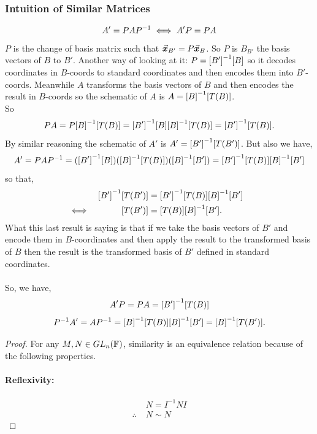 \documentclass[MathsNotesBase.tex]{subfiles}
\begin{document}
{		\medskip
		\subsubsection{Intuition of Similar Matrices}
		\[ A' = PA{P}^{-1} \iff A'P = PA \]
		$P$ is the change of basis matrix such that ${ \vec{\bm{x}}_{B'} = P\vec{\bm{x}}_B }$. So $P$ is $B_{B'}$ the basis vectors of $B$ \wrt to $B'$. Another way of looking at it: ${ P = {[B']}^{-1}[B] }$ so it decodes coordinates in $B$-coords to standard coordinates and then encodes them into $B'$-coords. Meanwhile $A$ transforms the basis vectors of $B$ and then encodes the result in $B$-coords so the schematic of $A$ is ${ A = {[B]}^{-1}[T(B)] }$.\\
		So 
		\[ PA = P{[B]}^{-1}[T(B)] = {[B']}^{-1}[B]{[B]}^{-1}[T(B)] = {[B']}^{-1}[T(B)]. \]
		By similar reasoning the schematic of $A'$ is ${ A' = {[B']}^{-1}[T(B')] }$. But also we have,
		\[ A' = PA{P}^{-1} = ({[B']}^{-1}[B])({[B]}^{-1}[T(B)])({[B]}^{-1}[B']) = {[B']}^{-1}[T(B)]{[B]}^{-1}[B'] \]
		so that,
		\begin{align*}
		&& {[B']}^{-1}[T(B')] &= {[B']}^{-1}[T(B)]{[B]}^{-1}[B'] \\
		&\iff & [T(B')] &= [T(B)]{[B]}^{-1}[B']. &\text{\scriptsize{}} \\
		\end{align*}
		What this last result is saying is that if we take the basis vectors of $B'$ and encode them in $B$-coordinates and then apply the result to the transformed basis of $B$ then the result is the transformed basis of $B'$ defined in standard coordinates.\\\\
		So, we have,
		\[ A'P = PA = {[B']}^{-1}[T(B)] \]
		\[ {P}^{-1}A' = A{P}^{-1} = {[B]}^{-1}[T(B)]{[B]}^{-1}[B'] = {[B]}^{-1}[T(B')]. \]
		
		\bigskip
		\begin{proof}
			For any ${ M,N \in GL_n(\mathbb{F}^{}) }$, similarity is an equivalence relation because of the following properties.
			
			\paragraph{\small{Reflexivity:}}
			\begin{align*}
			& N = I^{-1}NI \\
			\therefore \; & N \sim N
			\end{align*}
			

\end{proof}}
\end{document}
